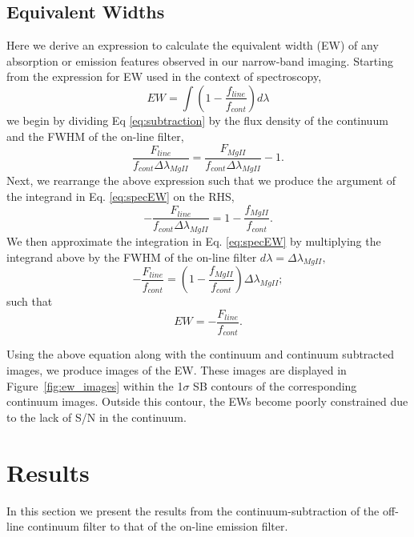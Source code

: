 \documentclass[twocolumn]{aastex6}
\begin{document}
\subsection{Equivalent Widths}\label{subsec.ew}
Here we derive an expression to calculate the equivalent width (EW) of any absorption or emission features observed in our narrow-band imaging. Starting from the expression for EW used in the context of spectroscopy,
\begin{equation}
EW=\int (1-\frac{f_{line}}{f_{cont}})d\lambda
\label{eq:specEW}
\end{equation}
we begin by dividing Eq \ref{eq:subtraction} by the flux density of the continuum and the FWHM of the on-line filter,
\begin{equation}
\frac{F_{line}}{f_{cont}\Delta \lambda_{MgII}}=\frac{F_{MgII}}{f_{cont}\Delta \lambda_{MgII}}- 1.
\end{equation}
Next, we rearrange the above expression such that we produce the argument of the integrand in Eq. \ref{eq:specEW} on the RHS,
\begin{equation}
-\frac{F_{line}}{f_{cont}\Delta \lambda_{MgII}}=1-\frac{f_{MgII}}{f_{cont}}.
\end{equation}
We then approximate the integration in Eq. \ref{eq:specEW} by multiplying the integrand above by the FWHM of the on-line filter $d\lambda=\Delta \lambda_{MgII},$
\begin{equation}
-\frac{F_{line}}{f_{cont}}=(1-\frac{f_{MgII}}{f_{cont}})\Delta \lambda_{MgII};
\end{equation}
such that
\begin{equation}
EW=-\frac{F_{line}}{f_{cont}}.
\end{equation}

Using the above equation along with the continuum and continuum subtracted images, we produce images of the EW. 
These images are displayed in Figure~\ref{fig:ew_images} within the 1$\sigma$ SB contours of the corresponding continuum images.
 Outside this contour, the EWs become poorly constrained due to the lack of S/N in the continuum.  %

\section{Results}
In this section we present the results from the continuum-subtraction of the off-line continuum filter to that of the on-line emission filter. 
\end{document}
